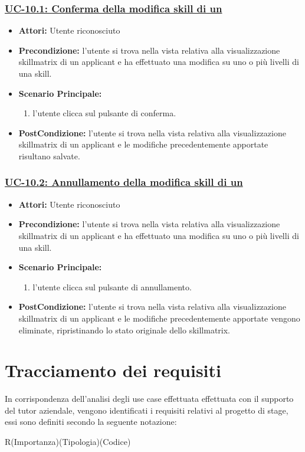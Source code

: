 \subsubsection{\underline{UC-10.1: Conferma della modifica skill di un \applicant}}
\begin{itemize}
	\item \textbf{Attori:} Utente riconosciuto
	\item \textbf{Precondizione:} l'utente si trova nella vista relativa alla visualizzazione skillmatrix di un applicant e ha effettuato una modifica su uno o più livelli di una skill.
	\item \textbf{Scenario Principale:}
	\begin{enumerate}
		\item l'utente clicca sul pulsante di conferma.
	\end{enumerate}
	\item \textbf{PostCondizione:} l'utente si trova nella vista relativa alla visualizzazione skillmatrix di un applicant e le modifiche precedentemente apportate risultano salvate.
\end{itemize}

\subsubsection{\underline{UC-10.2: Annullamento della modifica skill di un\applicant}}
\begin{itemize}
	\item \textbf{Attori:} Utente riconosciuto
	\item \textbf{Precondizione:} l'utente si trova nella vista relativa alla visualizzazione skillmatrix di un applicant e ha effettuato una modifica su uno o più livelli di una skill.
	\item \textbf{Scenario Principale:}
	\begin{enumerate}
		\item l'utente clicca sul pulsante di annullamento.
	\end{enumerate}
	\item \textbf{PostCondizione:} l'utente si trova nella vista relativa alla visualizzazione skillmatrix di un applicant e le modifiche precedentemente apportate vengono eliminate, ripristinando lo stato originale dello skillmatrix.
\end{itemize}

\section{Tracciamento dei requisiti}
In corrispondenza dell'analisi degli use case effettuata effettuata con il supporto del tutor aziendale, vengono identificati i requisiti relativi al progetto di stage, essi sono definiti secondo la seguente notazione:
\vspace{1em}
\begin{center}
	R(Importanza)(Tipologia)(Codice)
\end{center}


